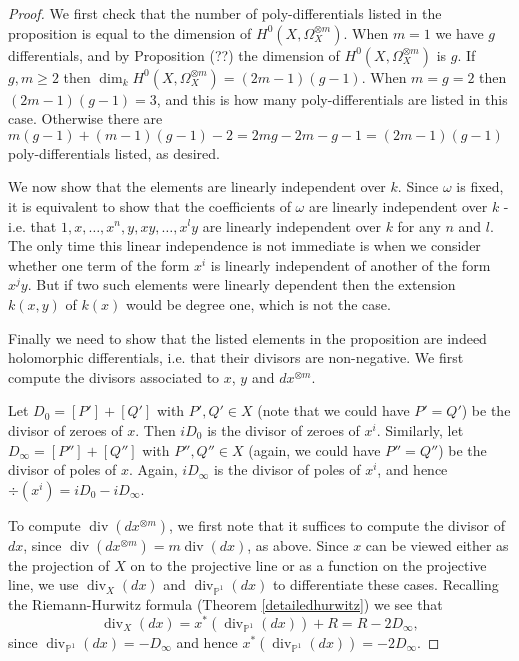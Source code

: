\documentclass[11pt]{article} %
\theoremstyle{plain}
\theoremstyle{remark}
\DeclareMathOperator{\ord}{ord}
\DeclareMathOperator{\di}{div}
\begin{document}
\begin{proof}
We first check that the number of poly-differentials listed in the proposition is equal to the dimension of $H^0(X,\Omega_X^{\otimes m})$.
When $m=1$ we have $g$ differentials, and by Proposition (??) the dimension of $H^0(X,\Omega_X^{\otimes m})$ is $g$.
If $g,m\geq 2$ then $\dim_kH^0(X,\Omega_X^{\otimes m}) = (2m-1)(g-1)$.
When $m=g=2$ then $(2m-1)(g-1) = 3$, and this is how many poly-differentials are listed in this case.
Otherwise there are $m(g-1) + (m-1)(g-1)-2 = 2mg - 2m - g -1 = (2m-1)(g-1)$ poly-differentials listed, as desired.

We now show that the elements are linearly independent over $k$.
Since $\omega$ is fixed, it is equivalent to show that the coefficients of $\omega$ are linearly independent over $k$ - i.e. that $1,x,\ldots ,x^n, y, xy, \ldots ,x^ly$ are linearly independent over $k$ for any $n$ and $l$.
The only time this linear independence is not immediate is when we consider whether one term of the form $x^i$ is linearly independent of another of the form $x^jy$.
But if two such elements were linearly dependent then the extension $k(x,y)$ of $k(x)$ would be degree one, which is not the case.

Finally we need to show that the listed elements in the proposition are indeed holomorphic differentials, i.e. that their divisors are non-negative.
We first compute the divisors associated to $x$, $y$ and $dx^{\otimes m}$.
\begin{comment}
For any $f\in K(X)$ we will denote by $(f)_0$ and $(f)_\infty$ the divisor of zeroes and divisor of poles of $f$ respectively.
In particular, 
\[
          (f)_0 := \sum_{\{P\in X|\ord_P(f)>0\}}\ord_P(f)[P],      
 \]
 and 
 \[
 (f)_\infty = \sum_{\{P\in X |\ord_P(f)<0\}} -\ord_P(f)[P].
 \]
\end{comment}

Let $D_0 = [P']+[Q']$ with $P',Q' \in X$ (note that we could have $P' = Q'$) be the divisor of zeroes of $x$. 
Then $ i D_0$ is the divisor of zeroes of $x^i$. 
Similarly, let $D_\infty = [P''] + [Q'']$ with $P'', Q'' \in X$ (again, we could have $P''=Q''$) be the divisor of poles of $x$. 
Again, $iD_\infty$ is the divisor of poles of $x^i$, and hence $\div(x^i) = iD_0 - iD_\infty$.

To compute $\di (dx^{\otimes m})$, we first note that it suffices to compute the divisor of $dx$, since $\di (dx^{\otimes m}) =m\di (dx)$, as above.
Since $x$ can be viewed either as the projection of $X$ on to the projective line or as a function on the projective line, we use $\di_X (dx)$ and $\di_{\mathbb P^1} (dx)$ to differentiate these cases.
Recalling the Riemann-Hurwitz formula (Theorem \ref{detailedhurwitz}) we see that
\[
 \di_X (dx) = x^*( \di_{\mathbb P^1}(dx)) + R = R - 2D_{\infty},
\]
since $\di_{\mathbb P^1}(dx) = -D_\infty$ and hence $x^* (\di_{\mathbb P^1}(dx)) = -2D_\infty$.


\end{proof}
\end{document}
